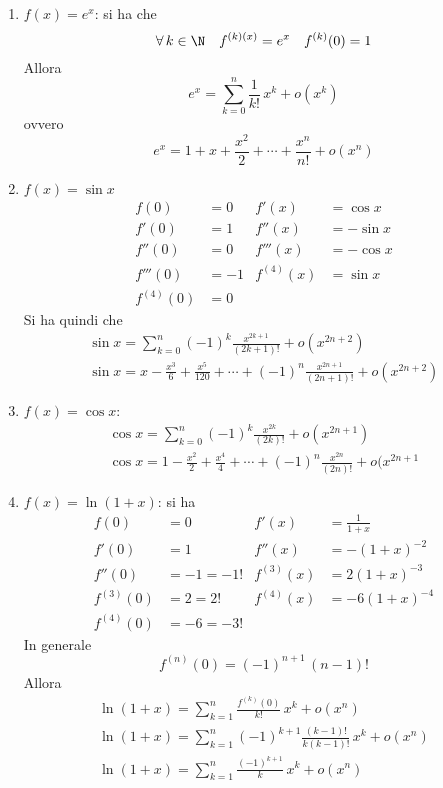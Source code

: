 \begin{enumerate}
    \item $ f(x)=e^{x} $: si ha che \[\forall\, k \in \N \quad f^{(k)(x)}=e^{x}\quad f^{(k)}(0)=1\] Allora \[
        e^{x}=\sum_{k=0}^{n}\frac{1}{k!}\,x^{k} + o(x^{k})
    \] ovvero \[
        e^{x}=1+x+\frac{x^{2}}{2}+\cdots+\frac{x^{n}}{n!}+o(x^{n})
    \]
    \item $ f(x)=\sin x $
    \begin{align*}
        f(0)&=0 & f'(x)&=\cos x\\
        f'(0)&=1 & f''(x)&=-\sin x\\
        f''(0)&=0 & f'''(x)&= -\cos x\\
        f'''(0)&=-1 & f^{(4)}(x)&= \sin x\\
        f^{(4)}(0)&=0
    \end{align*}
    Si ha quindi che \begin{gather*}
        \sin x =\sum_{k=0}^{n} (-1)^{k} \frac{x^{2k+1}}{(2k+1)!}+o\left(x^{2n+2}\right)\\
        \sin x = x - \frac{x^{3}}{6} + \frac{x^{5}}{120}+\cdots+(-1)^{n}\frac{x^{2n+1}}{(2n+1)!}+o(x^{2n+2})
    \end{gather*}
    \item $ f(x)=\cos x $: \begin{gather*}
        \cos x =\sum_{k=0}^{n}(-1)^{k}\frac{x^{2k}}{(2k)!} + o(x^{2n+1})\\
        \cos x =1 - \frac{x^{2}}{2} + \frac{x^{4}}{4}+\cdots+ (-1)^{n}\frac{x^{2n}}{(2n)!}+o(x^{2n+1}
    \end{gather*}
    \item $ f(x)=\ln(1+x) $: si ha \begin{align*}
        f(0)&=0 & f'(x)&=\frac{1}{1+x}\\
        f'(0)&=1 & f''(x)&=-(1+x)^{-2}\\
        f''(0)&=-1=-1! & f^{(3)}(x)&=2(1+x)^{-3}\\
        f^{(3)}(0)&=2=2! & f^{(4)}(x)&=-6(1+x)^{-4}\\
        f^{(4)}(0)&= -6=-3!
    \end{align*}
    In generale \[
        f^{(n)}(0)=(-1)^{n+1}\,(n-1)!
    \]
    Allora \begin{gather*}
        \ln(1+x)=\sum_{k=1}^{n} \frac{f^{(k)}(0)}{k!}\,x^{k} + o(x^n)\\
        \ln(1+x)=\sum_{k=1}^{n} (-1)^{k+1}\frac{(k-1)!}{k(k-1)!}\,x^k + o(x^n)\\
        \ln(1+x)=\sum_{k=1}^{n} \frac{(-1)^{k+1}}{k}\,x^k + o(x^n)

\end{gather*}
\end{enumerate}
